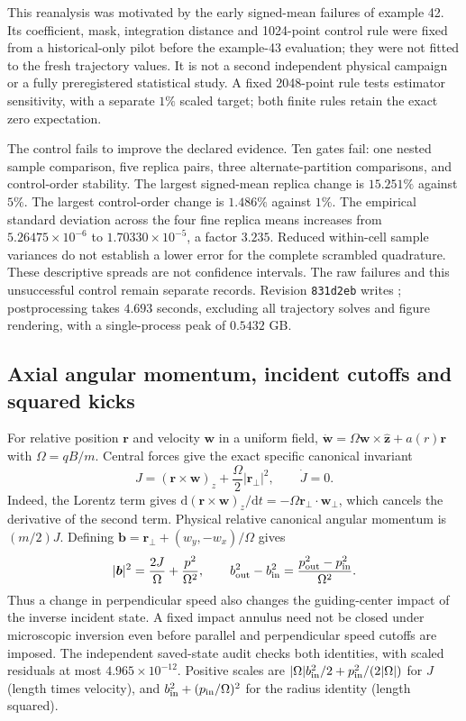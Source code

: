 \documentclass[11pt,letterpaper]{article}
\newcommand{\dd}{\mathrm d}
\begin{document}
This reanalysis was motivated by the early signed-mean failures of example
42. Its coefficient, mask, integration distance and 1024-point control rule
were fixed from a historical-only pilot before the example-43 evaluation;
they were not fitted to the fresh trajectory values. It is not a second
independent physical campaign or a fully preregistered statistical study.
A fixed 2048-point rule tests estimator sensitivity, with a separate $1\%$
scaled target; both finite rules retain the exact zero expectation.

The control fails to improve the declared evidence. Ten gates fail:
one nested sample comparison, five replica pairs, three alternate-partition
comparisons, and control-order stability. The largest signed-mean replica
change is $15.251\%$ against $5\%$. The largest control-order change is
$1.486\%$ against $1\%$. The empirical standard deviation across the four
fine replica means increases from $5.26475\times10^{-6}$ to
$1.70330\times10^{-5}$, a factor $3.235$. Reduced within-cell sample
variances do not establish a lower error for the complete scrambled
quadrature. These descriptive spreads are not confidence intervals.
The raw failures and this unsuccessful control remain separate records.
Revision \texttt{831d2eb} writes ;
postprocessing takes $4.693$ seconds, excluding all trajectory solves and
figure rendering, with a single-process peak of $0.5432$ GB.


\subsection*{Axial angular momentum, incident cutoffs and squared kicks}
For relative position $\bm r$ and velocity $\bm w$ in a uniform field,
$\dot{\bm w}=\Omega\bm w\times\hat{\bm z}+a(r)\bm r$ with
$\Omega=qB/m$. Central forces give the exact specific canonical invariant
\[
 J=(\bm r\times\bm w)_z+\frac{\Omega}{2}|\bm r_\perp|^2,
 \qquad \dot J=0.
\]
Indeed, the Lorentz term gives
$\dd(\bm r\times\bm w)_z/\dd t=-\Omega\bm r_\perp\cdot\bm w_\perp$,
which cancels the derivative of the second term. Physical relative
canonical angular momentum is $(m/2)J$. Defining
$\bm b=\bm r_\perp+(w_y,-w_x)/\Omega$ gives
\[
 |\bm b|^2=\frac{2J}{\Omega}+\frac{p^2}{\Omega^2},\qquad
 b_{\rm out}^2-b_{\rm in}^2=
 \frac{p_{\rm out}^2-p_{\rm in}^2}{\Omega^2}.
\]
Thus a change in perpendicular speed also changes the guiding-center
impact of the inverse incident state. A fixed impact annulus need not be
closed under microscopic inversion even before parallel and perpendicular
speed cutoffs are imposed. The independent saved-state audit checks both
identities, with scaled residuals at most $4.965\times10^{-12}$. Positive
scales are $|\Omega|b_{\rm in}^2/2+p_{\rm in}^2/(2|\Omega|)$ for $J$
(length times velocity), and $b_{\rm in}^2+(p_{\rm in}/\Omega)^2$ for the
radius identity (length squared).
\end{document}
